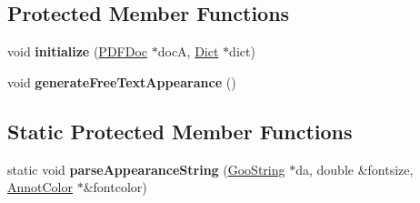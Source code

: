 \subsection*{Protected Member Functions}
\begin{DoxyCompactItemize}
\item 
\mbox{\label{class_annot_free_text_a63cc7c90653a5460d194645d370196f3}} 
void {\bfseries initialize} (\hyperlink{class_p_d_f_doc}{P\+D\+F\+Doc} $\ast$docA, \hyperlink{class_dict}{Dict} $\ast$dict)
\item 
\mbox{\label{class_annot_free_text_a19097ff31345809139a0d8efae302caa}} 
void {\bfseries generate\+Free\+Text\+Appearance} ()
\end{DoxyCompactItemize}
\subsection*{Static Protected Member Functions}
\begin{DoxyCompactItemize}
\item 
\mbox{\label{class_annot_free_text_afdbdd89be336a992298f19f6f46face1}} 
static void {\bfseries parse\+Appearance\+String} (\hyperlink{class_goo_string}{Goo\+String} $\ast$da, double \&fontsize, \hyperlink{class_annot_color}{Annot\+Color} $\ast$\&fontcolor)
\end{DoxyCompactItemize}
